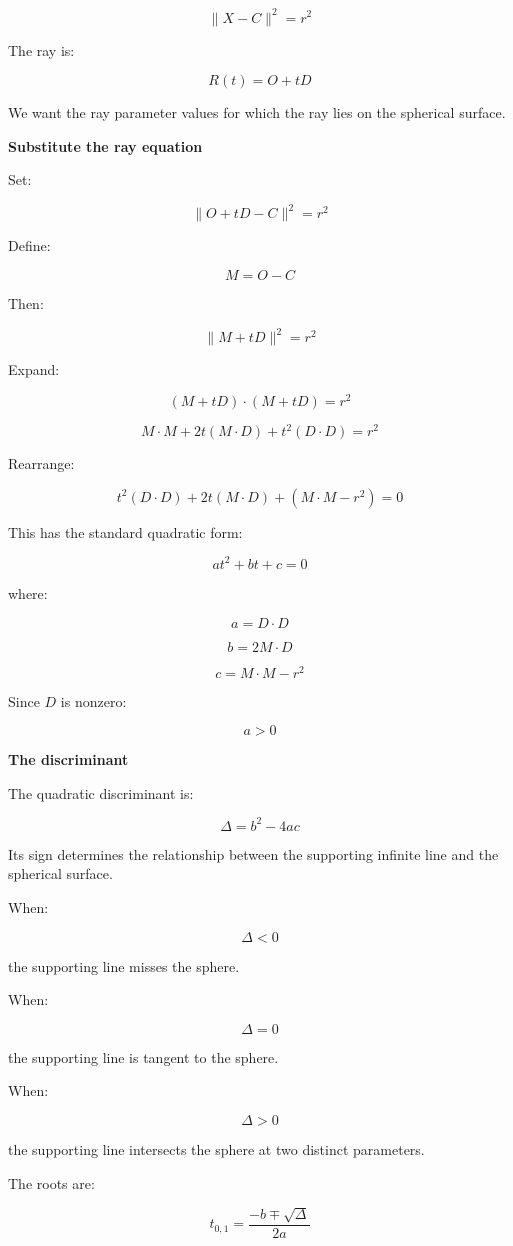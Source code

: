 \[
\boxed{ \|X-C\|^2=r^2 }
\]

The ray is:

\[
R(t)=O+tD
\]

We want the ray parameter values for which the ray lies on the spherical surface.

\textbf{Substitute the ray equation}

Set:

\[
\|O+tD-C\|^2=r^2
\]

Define:

\[
M=O-C
\]

Then:

\[
\|M+tD\|^2=r^2
\]

Expand:

\[
(M+tD)\cdot(M+tD)=r^2
\]

\[
M\cdot M+2t(M\cdot D)+t^2(D\cdot D)=r^2
\]

Rearrange:

\[
t^2(D\cdot D)+2t(M\cdot D)+(M\cdot M-r^2)=0
\]

This has the standard quadratic form:

\[
\boxed{at^2+bt+c=0}
\]

where:

\[
\boxed{ a=D\cdot D }
\]

\[
\boxed{ b=2M\cdot D }
\]

\[
\boxed{ c=M\cdot M-r^2 }
\]

Since \(D\) is nonzero:

\[
a>0
\]

\textbf{The discriminant}

The quadratic discriminant is:

\[
\boxed{ \Delta=b^2-4ac }
\]

Its sign determines the relationship between the supporting infinite line and the spherical surface.

When:

\[
\Delta<0
\]

the supporting line misses the sphere.

When:

\[
\Delta=0
\]

the supporting line is tangent to the sphere.

When:

\[
\Delta>0
\]

the supporting line intersects the sphere at two distinct parameters.

The roots are:

\[
\boxed{ t_{0,1}= \frac{-b\mp\sqrt{\Delta}}{2a} }
\]


